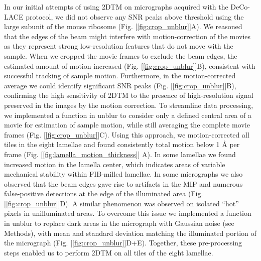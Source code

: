 \documentclass[
]{article}
\begin{document}
In our initial attempts of using 2DTM on micrographs acquired with the
DeCo-LACE protocol, we did not observe any SNR peaks above threshold
using the large subunit of the mouse ribosome (Fig.
{[}\ref{fig:crop_unblur}{]}A). We reasoned that the edges of the beam might
interfere with motion-correction of the movies as they represent strong
low-resolution features that do not move with the sample. When we
cropped the movie frames to exclude the beam edges, the estimated amount
of motion increased (Fig. {[}\ref{fig:crop_unblur}{]}B), consistent with
successful tracking of sample motion. Furthermore, in the
motion-corrected average we could identify significant SNR peaks (Fig.
{[}\ref{fig:crop_unblur}{]}B), confirming the high sensitivity of 2DTM to the
presence of high-resolution signal preserved in the images by the motion
correction. To streamline data processing, we implemented a function in
unblur to consider only a defined central area of a movie for estimation
of sample motion, while still averaging the complete movie frames (Fig.
{[}\ref{fig:crop_unblur}{]}C). Using this approach, we motion-corrected all tiles
in the eight lamellae and found consistently total motion below 1 Å per
frame (Fig. {[}\ref{fig:lamella_motion_thickness}{]} A). In some lamellae we
found increased motion in the lamella center, which indicates areas of
variable mechanical stability within FIB-milled lamellae. In some
micrographs we also observed that the beam edges gave rise to artifacts
in the MIP and numerous false-positive detections at the edge of the
illuminated area (Fig. {[}\ref{fig:crop_unblur}{]}D). A similar phenomenon was
observed on isolated ``hot'' pixels in unilluminated areas. To overcome
this issue we implemented a function in unblur to replace dark areas in
the micrograph with Gaussian noise (see Methods), with mean and standard
deviation matching the illuminated portion of the micrograph (Fig.
{[}\ref{fig:crop_unblur}{]}D+E). Together, these pre-processing steps enabled us
to perform 2DTM on all tiles of the eight lamellae.
\end{document}
